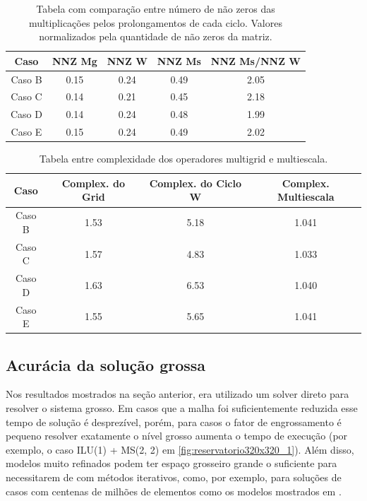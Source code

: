 \begin{table}[]
\centering
\caption{Tabela com comparação entre número de não zeros das multiplicações pelos prolongamentos de cada ciclo. Valores normalizados pela quantidade de não zeros da matriz.} \label{tab:comparacaoMsxMgProlongamento}
\begin{tabular}{|c|c|c|c|c|}
\hline
\textbf{Caso} & \textbf{NNZ Mg} & \textbf{NNZ W} & \textbf{NNZ Ms} & \textbf{NNZ Ms/NNZ W} \\ \hline
Caso B & 0.15 & 0.24 & 0.49 & 2.05 \\ \hline
Caso C & 0.14 & 0.21 & 0.45 & 2.18 \\ \hline
Caso D & 0.14 & 0.24 & 0.48 & 1.99 \\ \hline
Caso E & 0.15 & 0.24 & 0.49 & 2.02 \\ \hline
\end{tabular}
\end{table}




\begin{table}[]
\centering
\caption{Tabela entre complexidade dos operadores multigrid e multiescala.} \label{tab:comparacaoMsxMgComplexidade}
\begin{tabular}{|c|c|c|c|}
\hline
\textbf{Caso} & \textbf{Complex. do Grid} & \textbf{Complex. do Ciclo W} & \textbf{Complex. Multiescala} \\ \hline
Caso B        & 1.53                          & 5.18                           & 1.041                             \\ \hline
Caso C        & 1.57                          & 4.83                           & 1.033                             \\ \hline
Caso D        & 1.63                          & 6.53                           & 1.040                             \\ \hline
Caso E        & 1.55                          & 5.65                           & 1.041                             \\ \hline
\end{tabular}
\end{table}

\subsection{Acurácia da solução grossa}

Nos resultados mostrados na seção anterior, era utilizado um solver direto para resolver o sistema grosso. Em casos que a malha foi suficientemente reduzida esse tempo de solução é desprezível, porém, para casos o fator de engrossamento é pequeno resolver exatamente o nível grosso aumenta o tempo de execução (por exemplo, o caso ILU(1) + MS(2, 2) em \ref{fig:reservatorio320x320_1}). Além disso, modelos muito refinados podem ter espaço grosseiro grande o suficiente para necessitarem de com métodos iterativos, como, por exemplo, para soluções de casos com centenas de milhões de elementos como os modelos mostrados em \cite{geomecrio}.

